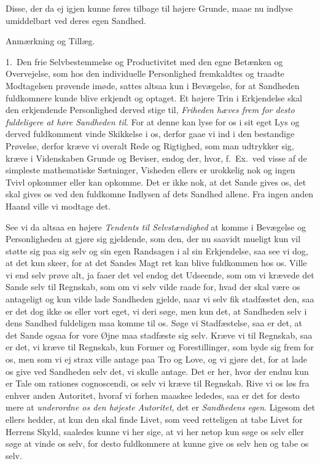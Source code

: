 \documentclass[12pt,a4paper]{book}
\newcommand{\apage}[1]{\marginnote{\footnotesize\textit{[#1]}}}
\begin{document}
Disse, der da ej igjen kunne føres tilbage til højere Grunde, maae nu indlyse
umiddelbart ved deres egen Sandhed.

\begin{center}Anmærkning og Tillæg.\end{center}

1.~Den frie Selvbestemmelse og Productivitet med den egne Betænken og
Overvejelse, som hos den individuelle Personlighed fremkaldtes og traadte
Modtagelsen prøvende imøde, sattes altsaa kun i Bevægelse, for at Sandheden
fuldkomnere kunde blive erkjendt og optaget. Et højere Trin i Erkjendelse skal
den erkjendende Personlighed derved \apage{50}  stige til, \emph{Friheden hæves frem for desto
fuldeligere at høre Sandheden til}. For at denne kan lyse for os i sit eget Lys og
derved fuldkomment vinde Skikkelse i os, derfor gaae vi ind i den bestandige
Prøvelse, derfor kræve vi overalt Rede og Rigtighed, som man udtrykker sig, kræve
i Videnskaben Grunde og Beviser, endog der, hvor, f.~Ex.\ ved visse af de
simpleste mathematiske Sætninger, Visheden ellers er urokkelig nok og ingen Tvivl
opkommer eller kan opkomme. Det er ikke nok, at det Sande gives os, det skal gives
os ved den fuldkomne Indlysen af dets Sandhed allene. Fra ingen anden Haand ville
vi modtage det.

See vi da altsaa en højere \emph{Tendents til Selvstændighed} at komme i
Bevægelse og Personligheden at gjøre sig gjeldende, som den, der nu saavidt
mueligt kun vil støtte sig paa sig selv og sin egen Randsagen i al sin
Erkjendelse, saa see vi dog, at det kun skeer, for at det Sandes Magt ret kan
blive fuldkommen hos os. Ville vi end selv prøve alt, ja faaer det vel endog det
Udseende, som om vi krævede det Sande selv til Regnskab, som om vi selv vilde
raade for, hvad der skal være os antageligt og kun vilde lade Sandheden gjelde,
naar vi selv fik stadfæstet den, saa er det dog ikke os eller vort eget, vi deri
søge, men kun det, at Sandheden selv i dens Sandhed fuldeligen maa komme til os.
Søge vi  \apage{51} Stadfæstelse, saa er det, at det Sande ogsaa for vore Øjne maa stadfæste
sig selv. Kræve vi til Regnskab, saa er det, vi kræve til Regnskab, kun Former og
Forestillinger, som byde sig frem for os, men som vi ej strax ville antage paa Tro
og Love, og vi gjøre det, for at lade os give ved Sandheden selv det, vi skulle
antage. Det er her, hvor der endnu kun er Tale om rationes cognoscendi, os selv
vi kræve til Regnskab. Rive vi os løs fra enhver anden Autoritet, hvoraf vi forhen
maaskee lededes, saa er det for desto mere at \emph{underordne os den højeste
Autoritet}, det er \emph{Sandhedens egen}. Ligesom det ellers hedder, at kun den skal
finde Livet, som veed retteligen at tabe Livet for Herrens Skyld, saaledes kunne
vi her sige, at vi her netop kun søge os selv eller søge at vinde os selv, for
desto fuldkomnere at kunne give os selv hen og tabe os selv.
\end{document}
